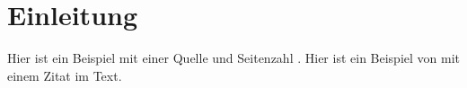 \documentclass[12pt, twoside = false, bibliography=totoc]{scrbook}
\begin{document}


\frontmatter

\tableofcontents

\listoffigures
{}
\vspace*{24pt}
{\let\clearpage\relax \listoftables}	

\mainmatter

\chapter{Einleitung}\label{Einleitung} %

Hier ist ein Beispiel mit einer Quelle und Seitenzahl \parencite[S. 103]{wangnerud_2009}. Hier ist ein Beispiel von \textcite{erikson_2018} mit einem Zitat im Text.




\setlength{\parskip}{8pt}
\printbibliography[title={Literaturverzeichnis}]

    
\end{document}
